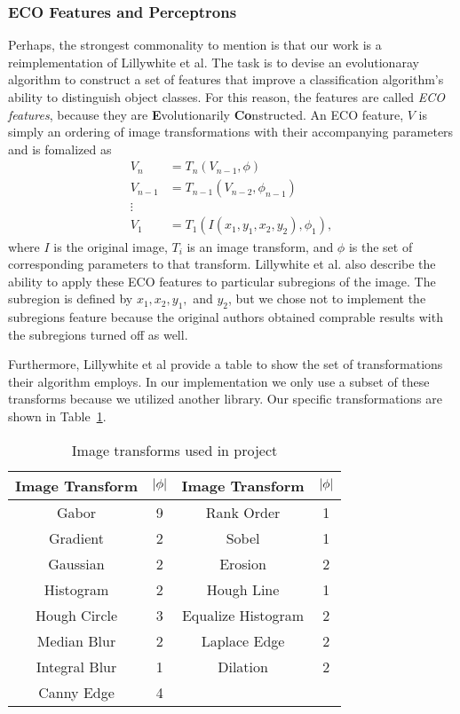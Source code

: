 \documentclass[conference]{IEEEtran}
\DeclarePairedDelimiter\abs{\lvert}{\rvert}
\begin{document}
\subsubsection{ECO Features and Perceptrons}
Perhaps, the strongest commonality to mention is that our work is a reimplementation of Lillywhite et al. The task is to devise an evolutionaray algorithm to construct a set of features that improve a classification algorithm's ability to distinguish object classes. For this reason, the features are called {\it ECO features}, because they are {\bf E}volutionarily {\bf Co}nstructed. An ECO feature, $V$ is simply an ordering of image transformations with their accompanying parameters and is fomalized as
\begin{equation}
  \begin{split}
    V_n & = T_n(V_{n-1}, \phi)\\
    V_{n-1} & = T_{n-1}(V_{n-2},\phi_{n-1})\\
    \vdots\\
    V_1 & = T_1(I(x_1,y_1,x_2,y_2), \phi_{1}),
  \end{split}
  \label{eq:eco}
\end{equation}
where $I$ is the original image, $T_i$ is an image transform, and $\phi$ is the set of corresponding parameters to that transform. Lillywhite et al. also describe the ability to apply these ECO features to particular subregions of the image. The subregion is defined by $x_1, x_2, y_1,$ and $y_2$, but we chose not to implement the subregions feature because the original authors obtained comprable results with the subregions turned off as well.

Furthermore, Lillywhite et al provide a table to show the set of transformations their algorithm employs. In our implementation we only use a subset of these transforms because we utilized another library. Our specific transformations are shown in Table~\ref{tab:transforms}. 
\begin{table}[t]
  \centering
  \begin{tabular}{c c c c}
    \hline
    Image Transform & $\abs{\phi}$ & Image Transform & $\abs{\phi}$\\
    \hline
    Gabor & 9 & Rank Order & 1\\
    Gradient & 2 & Sobel & 1\\
    Gaussian & 2 & Erosion & 2\\
    Histogram & 2 & Hough Line & 1\\
    Hough Circle & 3 & Equalize Histogram & 2\\
    Median Blur & 2 & Laplace Edge & 2\\
    Integral Blur & 1 & Dilation & 2\\
    Canny Edge & 4\\
    \hline
  \end{tabular}
  \caption{Image transforms used in project}
  \label{tab:transforms}
\end{table}
\end{document}
